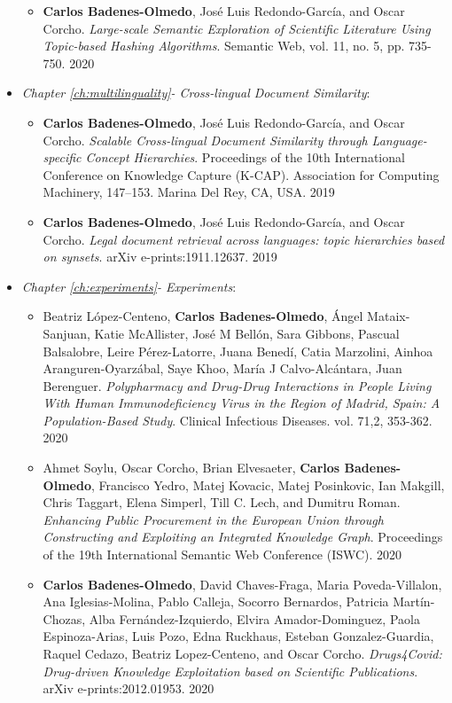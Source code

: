 \begin{itemize}
\begin{itemize}
\item \textbf{Carlos Badenes-Olmedo}, José Luis Redondo-García, and Oscar Corcho. \textit{Large-scale Semantic Exploration of Scientific Literature Using Topic-based Hashing Algorithms}. Semantic Web, vol. 11, no. 5, pp. 735-750. 2020
\end{itemize}
\item \textit{Chapter \ref{ch:multilinguality}- Cross-lingual Document Similarity}:
\begin{itemize}
\item \textbf{Carlos Badenes-Olmedo}, José Luis Redondo-García, and Oscar Corcho. \textit{Scalable Cross-lingual Document Similarity through Language-specific Concept Hierarchies}. Proceedings of the 10th International Conference on Knowledge Capture (K-CAP). Association for Computing Machinery, 147–153. Marina Del Rey, CA, USA. 2019
\item \textbf{Carlos Badenes-Olmedo}, José Luis Redondo-García, and Oscar Corcho. \textit{Legal document retrieval across languages: topic hierarchies based on synsets}. arXiv e-prints:1911.12637. 2019
\end{itemize}
\item \textit{Chapter \ref{ch:experiments}- Experiments}:
\begin{itemize}
\item Beatriz López-Centeno, \textbf{Carlos Badenes-Olmedo}, Ángel Mataix-Sanjuan, Katie McAllister, José M Bellón, Sara Gibbons, Pascual Balsalobre, Leire Pérez-Latorre, Juana Benedí, Catia Marzolini, Ainhoa Aranguren-Oyarzábal, Saye Khoo, María J Calvo-Alcántara, Juan Berenguer. \textit{Polypharmacy and Drug-Drug Interactions in People Living With Human Immunodeficiency Virus in the Region of Madrid, Spain: A Population-Based Study}. Clinical Infectious Diseases. vol. 71,2, 353-362. 2020
\item Ahmet Soylu, Oscar Corcho, Brian Elvesaeter, \textbf{Carlos Badenes-Olmedo}, Francisco Yedro, Matej Kovacic, Matej Posinkovic, Ian Makgill, Chris Taggart, Elena Simperl, Till C. Lech, and Dumitru Roman. \textit{Enhancing Public Procurement in the European Union through Constructing and Exploiting an Integrated Knowledge Graph}. Proceedings of the 19th International Semantic Web Conference (ISWC). 2020
\item \textbf{Carlos Badenes-Olmedo}, David Chaves-Fraga, Maria Poveda-Villalon, Ana Iglesias-Molina, Pablo Calleja, Socorro Bernardos, Patricia Martín-Chozas, Alba Fernández-Izquierdo, Elvira Amador-Dominguez, Paola Espinoza-Arias, Luis Pozo, Edna Ruckhaus, Esteban Gonzalez-Guardia, Raquel Cedazo, Beatriz Lopez-Centeno, and Oscar Corcho. \textit{Drugs4Covid: Drug-driven Knowledge Exploitation based on Scientific Publications}. arXiv e-prints:2012.01953. 2020
\end{itemize}
\end{itemize}



